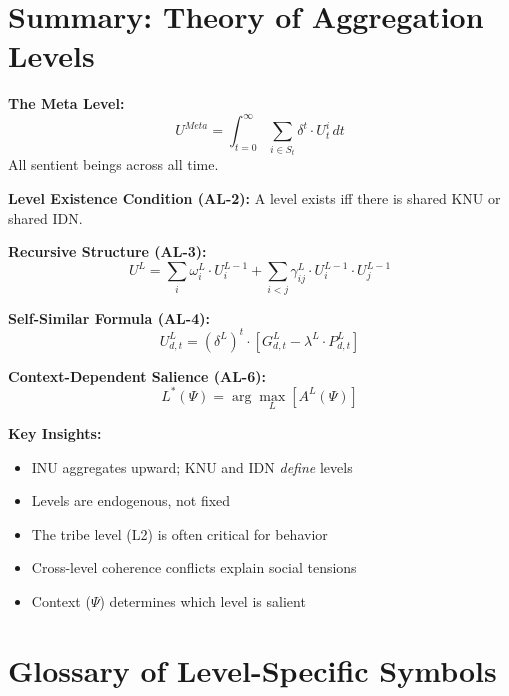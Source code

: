 \section{Summary: Theory of Aggregation Levels}
\label{sec:aaa-summary}

\begin{tcolorbox}[colback=gray!5!white, colframe=gray!75!black, title=Appendix AAA Summary]

\textbf{The Meta Level:}
$$U^{Meta} = \int_{t=0}^{\infty} \sum_{i \in S_t} \delta^t \cdot U^i_t \, dt$$
All sentient beings across all time.

\textbf{Level Existence Condition (AL-2):}
A level exists iff there is shared KNU or shared IDN.

\textbf{Recursive Structure (AL-3):}
$$U^L = \sum_i \omega^L_i \cdot U^{L-1}_i + \sum_{i<j} \gamma^L_{ij} \cdot U^{L-1}_i \cdot U^{L-1}_j$$

\textbf{Self-Similar Formula (AL-4):}
$$U^L_{d,t} = (\delta^L)^t \cdot [G^L_{d,t} - \lambda^L \cdot P^L_{d,t}]$$

\textbf{Context-Dependent Salience (AL-6):}
$$L^*(\Psi) = \arg\max_L [A^L(\Psi)]$$

\textbf{Key Insights:}
\begin{itemize}
\item INU aggregates upward; KNU and IDN \emph{define} levels
\item Levels are endogenous, not fixed
\item The tribe level (L2) is often critical for behavior
\item Cross-level coherence conflicts explain social tensions
\item Context ($\Psi$) determines which level is salient
\end{itemize}

\end{tcolorbox}

\section{Glossary of Level-Specific Symbols}
\label{sec:aaa-glossary}

